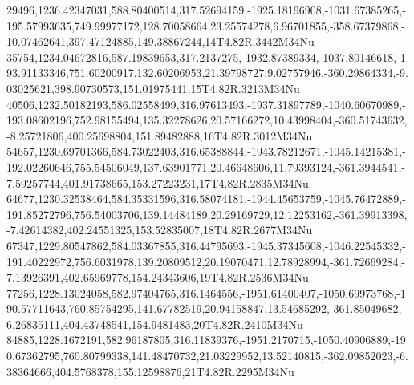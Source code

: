 29496,1236.42347031,588.80400514,317.52694159,-1925.18196908,-1031.67385265,-195.57993635,749.99977172,128.70058664,23.25574278,6.96701855,-358.67379868,-10.07462641,397.47124885,149.38867244,14T4.82R.3442M34Nu
35754,1234.04672816,587.19839653,317.2137275,-1932.87389334,-1037.80146618,-193.91133346,751.60200917,132.60206953,21.39798727,9.02757946,-360.29864334,-9.03025621,398.90730573,151.01975441,15T4.82R.3213M34Nu
40506,1232.50182193,586.02558499,316.97613493,-1937.31897789,-1040.60670989,-193.08602196,752.98155494,135.32278626,20.57166272,10.43998404,-360.51743632,-8.25721806,400.25698804,151.89482888,16T4.82R.3012M34Nu
54657,1230.69701366,584.73022403,316.65388844,-1943.78212671,-1045.14215381,-192.02260646,755.54506049,137.63901771,20.46648606,11.79393124,-361.3944541,-7.59257744,401.91738665,153.27223231,17T4.82R.2835M34Nu
64677,1230.32538464,584.35331596,316.58074181,-1944.45653759,-1045.76472889,-191.85272796,756.54003706,139.14484189,20.29169729,12.12253162,-361.39913398,-7.42614382,402.24551325,153.52835007,18T4.82R.2677M34Nu
67347,1229.80547862,584.03367855,316.44795693,-1945.37345608,-1046.22545332,-191.40222972,756.6031978,139.20809512,20.19070471,12.78928994,-361.72669284,-7.13926391,402.65969778,154.24343606,19T4.82R.2536M34Nu
77256,1228.13024058,582.97404765,316.1464556,-1951.61400407,-1050.69973768,-190.57711643,760.85754295,141.67782519,20.94158847,13.54685292,-361.85049682,-6.26835111,404.43748541,154.9481483,20T4.82R.2410M34Nu
84885,1228.1672191,582.96187805,316.11839376,-1951.2170715,-1050.40906889,-190.67362795,760.80799338,141.48470732,21.03229952,13.52140815,-362.09852023,-6.38364666,404.5768378,155.12598876,21T4.82R.2295M34Nu

